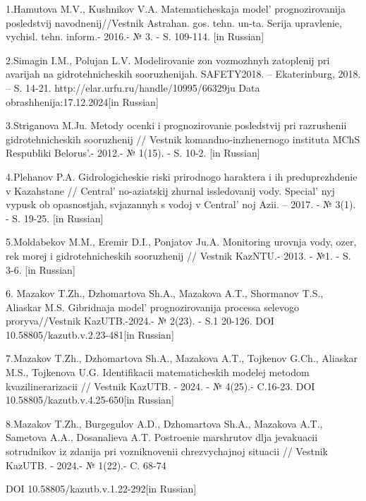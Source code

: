 \begin{references}
1.Hamutova M.V., Kushnikov V.A. Matematicheskaja model'{}
prognozirovanija posledstvij navodnenij//Vestnik Astrahan. gos. tehn.
un-ta. Serija upravlenie, vychisl. tehn. inform.- 2016.- № 3. - S.
109-114. {[}in Russian{]}

2.Simagin I.M., Polujan L.V. Modelirovanie zon vozmozhnyh zatoplenij pri
avarijah na gidrotehnicheskih sooruzhenijah. SAFETY2018. --
Ekaterinburg, 2018. -- S. 14-21.
http://elar.urfu.ru/handle/10995/66329ju Data
obrashhenija:17.12.2024{[}in Russian{]}

3.Striganova M.Ju. Metody ocenki i prognozirovanie posledstvij pri
razrushenii gidrotehnicheskih sooruzhenij // Vestnik
komandno-inzhenernogo instituta MChS Respubliki
Belorus'.- 2012.- № 1(15). - S. 10-2. {[}in Russian{]}

4.Plehanov P.A. Gidrologicheskie riski prirodnogo haraktera i ih
preduprezhdenie v Kazahstane // Central' no-aziatskij
zhurnal issledovanij vody. Special' nyj vypusk ob
opasnostjah, svjazannyh s vodoj v Central' noj Azii. --
2017. - № 3(1). - S. 19-25. {[}in Russian{]}

5.Moldabekov M.M., Eremir D.I., Ponjatov Ju.A. Monitoring urovnja vody,
ozer, rek morej i gidrotehnicheskih sooruzhenij // Vestnik KazNTU.-
2013. - №1. - S. 3-6. {[}in Russian{]}

6. Mazakov T.Zh., Dzhomartova Sh.A., Mazakova A.T., Shormanov T.S.,
Aliaskar M.S. Gibridnaja model'{} prognozirovanija
processa selevogo proryva//Vestnik KazUTB.-2024.- № 2(23). - S.1 20-126.
DOI 10.58805/kazutb.v.2.23-481{[}in Russian{]}

7.Mazakov T.Zh., Dzhomartova Sh.A., Mazakova A.T., Tojkenov G.Ch.,
Aliaskar M.S., Tojkenova U.G. Identifikacii matematicheskih modelej
metodom kvazilinerarizacii // Vestnik KazUTB. - 2024. - № 4(25).-
C.16-23. DOI 10.58805/kazutb.v.4.25-650{[}in Russian{]}

8.Mazakov T.Zh., Burgegulov A.D., Dzhomartova Sh.A., Mazakova A.T.,
Sametova A.A., Dosanalieva A.T. Postroenie marshrutov dlja jevakuacii
sotrudnikov iz zdanija pri vozniknovenii chrezvychajnoj situacii //
Vestnik KazUTB. - 2024.- № 1(22).- C. 68-74

DOI 10.58805/kazutb.v.1.22-292{[}in Russian{]}
\end{references}

